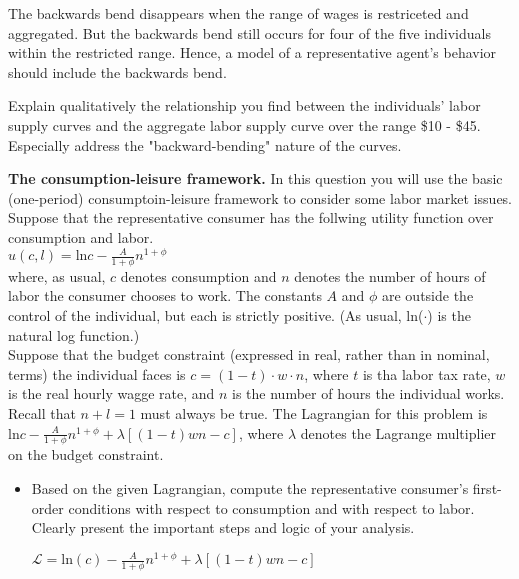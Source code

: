 \documentclass[11pt]{SelfArxOneColBMN}
\begin{document}
\begin{exercise}
\begin{itemize}
		\begin{solution}
			The backwards bend disappears when the range of wages is restriceted and aggregated. But the backwards bend still occurs for four of the five individuals within the restricted range. Hence, a model of a representative agent's behavior should include the backwards bend. 
		\end{solution}
	\end{itemize}
	Explain qualitatively the relationship you find between the individuals' labor supply curves and the aggregate labor supply curve over the range \$10 - \$45. Especially address the "backward-bending" nature of the curves.
\end{exercise}
\begin{exercise}
	\textbf{The consumption-leisure framework.} In this question you will use the basic (one-period) consumptoin-leisure framework to consider some labor market issues. Suppose that the representative consumer has the follwing utility function over consumption and labor.\\
	\indent $u(c,l) = \text{ln}c - \frac{A}{1 + \phi}n^{1+\phi}$\\
	where, as usual, $c$ denotes consumption and $n$ denotes the number of hours of labor the consumer chooses to work. The constants $A$ and $\phi$ are outside the control of the individual, but each is strictly positive. (As usual, ln($\cdot$) is the natural log function.)\\
	Suppose that the budget constraint (expressed in real, rather than in nominal, terms) the individual faces is $c = (1 - t)\cdot w \cdot n$, where $t$ is tha labor tax rate, $w$ is the real hourly wagge rate, and $n$ is the number of hours the individual works.\\
	Recall that $n + l = 1$ must always be true. The Lagrangian for this problem is\\
	\indent $\text{ln}c-\frac{A}{1 + \phi}n^{1 + \phi} + \lambda[(1 - t)wn - c]$, where $\lambda$ denotes the Lagrange multiplier on the budget constraint.
	\begin{itemize} 
		\item Based on the given Lagrangian, compute the representative consumer's first-order conditions with respect to consumption and with respect to labor. Clearly present the important steps and logic of your analysis.
		\begin{solution}
			\begin{center}
				$\mathcal{L} = \text{ln}(c) - \frac{A}{1 + \phi}n^{1 + \phi} + \lambda[(1 - t)wn - c]$\\

\end{center}
\end{solution}
\end{itemize}
\end{exercise}
\end{document}

